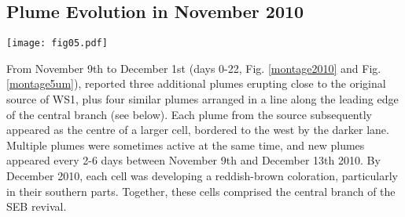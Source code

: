 \documentclass[final,authoryear,5p,times,twocolumn]{elsarticle}
\begin{document}
\subsection{Plume Evolution in November 2010}
\label{seq1}


\begin{figure*}
\begin{centering}
\centerline{\texttt{[image: fig05.pdf]}}
\caption{Comparison of 4.8-$\mu$m imaging and visible-light imaging from November 2010 to January 2011.  Each 4.8-$\mu$m image is accompanied by a visible-light image beneath it that was acquired nearby in time.  By combining observations from IRTF/SPEX, IRTF/NSFCAM2 and Gemini-N/NIRI (the latter of which has the highest spatial resolution), we are able to track the evolution of the central branch of the SEB revival centred on $160^\circ$W over the course of two months.  Note that the SPEX image on November 13th had to be heavily smoothed to improve the signal to noise, and that the NSFCAM2 images have a logarithmic scale to improve visibility of the small-scale contrasts.  The NIRI images on November 18th, 21st and 30th were formed from mosaics, so dark gaps can be seen where the images did not overlap.  These are uncalibrated counts, scaled to give the same contrasts in each panel.  The 4.8-$\mu$m maps are labelled with the locations of prominent bright lanes (dark in the visible images).  The visible maps are labelled with the location of white spots (WS), which sit at the centre of dark cells in the 4.8-$\mu$m maps. }
\label{montage5um}
\end{centering}
\end{figure*}

From November 9th to December 1st (days 0-22, Fig. \ref{montage2010} and Fig. \ref{montage5um}), \citet{11rogers_21,16rogers} reported three additional plumes erupting close to the original source of WS1, plus four similar plumes arranged in a line along the leading edge of the central branch (see below).   Each plume from the source subsequently appeared as the centre of a larger cell, bordered to the west by the darker lane.  Multiple plumes were sometimes active at the same time, and new plumes appeared every 2-6 days between November 9th and December 13th 2010.  By December 2010, each cell was developing a reddish-brown coloration, particularly in their southern parts.  Together, these cells comprised the central branch of the SEB revival. 
\end{document}

